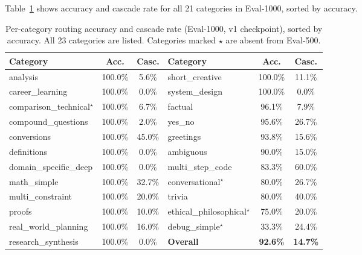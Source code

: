 \documentclass{article}
\begin{document}
Table~\ref{tab:percategory} shows accuracy and cascade rate for all 21
categories in Eval-1000, sorted by accuracy.

\begin{table}[t]
\caption{Per-category routing accuracy and cascade rate (Eval-1000, v1 checkpoint),
sorted by accuracy. All 23 categories are listed. Categories marked $\star$ are
absent from Eval-500.}
\label{tab:percategory}
\centering
\small
\begin{tabular}{lcc|lcc}
\toprule
\textbf{Category} & \textbf{Acc.} & \textbf{Casc.} &
\textbf{Category} & \textbf{Acc.} & \textbf{Casc.} \\
\midrule
analysis & 100.0\% & 5.6\% & short\_creative & 100.0\% & 11.1\% \\
career\_learning & 100.0\% & 0.0\% & system\_design & 100.0\% & 0.0\% \\
comparison\_technical$^\star$ & 100.0\% & 6.7\% & factual & 96.1\% & 7.9\% \\
compound\_questions & 100.0\% & 2.0\% & yes\_no & 95.6\% & 26.7\% \\
conversions & 100.0\% & 45.0\% & greetings & 93.8\% & 15.6\% \\
definitions & 100.0\% & 0.0\% & ambiguous & 90.0\% & 15.0\% \\
domain\_specific\_deep & 100.0\% & 0.0\% & multi\_step\_code & 83.3\% & 60.0\% \\
math\_simple & 100.0\% & 32.7\% & conversational$^\star$ & 80.0\% & 26.7\% \\
multi\_constraint & 100.0\% & 20.0\% & trivia & 80.0\% & 40.0\% \\
proofs & 100.0\% & 10.0\% & ethical\_philosophical$^\star$ & 75.0\% & 20.0\% \\
real\_world\_planning & 100.0\% & 16.0\% & debug\_simple$^\star$ & 33.3\% & 24.4\% \\
research\_synthesis & 100.0\% & 0.0\% & \textbf{Overall} & \textbf{92.6\%} & \textbf{14.7\%} \\
\bottomrule
\end{tabular}
\end{table}
\end{document}
